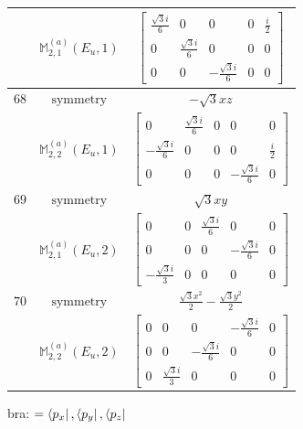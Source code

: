 \documentclass[fleqn,8pt,landscape]{jsarticle}
\begin{document}
\begin{longtable}{ccc}
$  $ & $ \mathbb{M}_{2,1}^{(a)}(E_{u},1) $ & $ \begin{bmatrix} \frac{\sqrt{3} i}{6} & 0 & 0 & 0 & \frac{i}{2} \\ 0 & \frac{\sqrt{3} i}{6} & 0 & 0 & 0 \\ 0 & 0 & - \frac{\sqrt{3} i}{6} & 0 & 0 \end{bmatrix} $ \\ \hline
$ 68 $ & $ \text{symmetry} $ & $ - \sqrt{3} x z $ \\
$  $ & $ \mathbb{M}_{2,2}^{(a)}(E_{u},1) $ & $ \begin{bmatrix} 0 & \frac{\sqrt{3} i}{6} & 0 & 0 & 0 \\ - \frac{\sqrt{3} i}{6} & 0 & 0 & 0 & \frac{i}{2} \\ 0 & 0 & 0 & - \frac{\sqrt{3} i}{6} & 0 \end{bmatrix} $ \\ \hline
$ 69 $ & $ \text{symmetry} $ & $ \sqrt{3} x y $ \\
$  $ & $ \mathbb{M}_{2,1}^{(a)}(E_{u},2) $ & $ \begin{bmatrix} 0 & 0 & \frac{\sqrt{3} i}{6} & 0 & 0 \\ 0 & 0 & 0 & - \frac{\sqrt{3} i}{6} & 0 \\ - \frac{\sqrt{3} i}{3} & 0 & 0 & 0 & 0 \end{bmatrix} $ \\ \hline
$ 70 $ & $ \text{symmetry} $ & $ \frac{\sqrt{3} x^{2}}{2} - \frac{\sqrt{3} y^{2}}{2} $ \\
$  $ & $ \mathbb{M}_{2,2}^{(a)}(E_{u},2) $ & $ \begin{bmatrix} 0 & 0 & 0 & - \frac{\sqrt{3} i}{6} & 0 \\ 0 & 0 & - \frac{\sqrt{3} i}{6} & 0 & 0 \\ 0 & \frac{\sqrt{3} i}{3} & 0 & 0 & 0 \end{bmatrix} $ \\ \hline
\end{longtable}
bra: $=\bra{p_{x}}, \bra{p_{y}}, \bra{p_{z}}$
\end{document}
